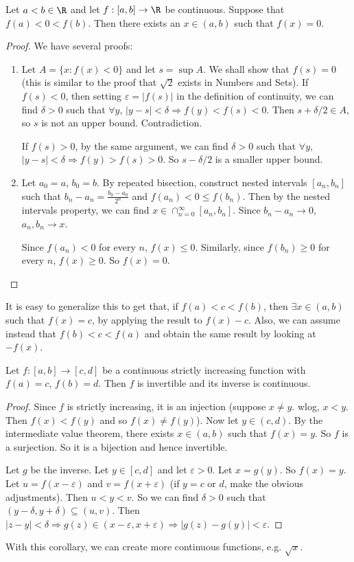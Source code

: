 \documentclass[a4paper]{article}
\begin{document}
\begin{thm}
  Let $a < b\in \R$ and let $f: [a, b] \to \R$ be continuous. Suppose that $f(a) < 0 < f(b)$. Then there exists an $x\in (a, b)$ such that $f(x) = 0$.
\end{thm}

\begin{proof}
  We have several proofs:
  \begin{enumerate}
    \item Let $A = \{x: f(x) < 0\}$ and let $s = \sup A$. We shall show that $f(s) = 0$ (this is similar to the proof that $\sqrt{2}$ exists in Numbers and Sets). If $f(s) < 0$, then setting $\varepsilon = |f(s)|$ in the definition of continuity, we can find $\delta > 0$ such that $\forall y$, $|y - s| < \delta \Rightarrow f(y) < f(s) < 0$. Then $s + \delta/2 \in A$, so $s$ is not an upper bound. Contradiction.

    If $f(s) > 0$, by the same argument, we can find $\delta > 0$ such that $\forall y$, $|y - s| < \delta \Rightarrow  f(y) > f(s) > 0$. So $s - \delta/2$ is a smaller upper bound.
  \item Let $a_0 = a$, $b_0 = b$. By repeated bisection, construct nested intervals $[a_n, b_n]$ such that $b_n - a_n = \frac{b_0 - a_0}{2^n}$ and $f(a_n) < 0 \leq f(b_n)$. Then by the nested intervals property, we can find $x\in \cap_{n = 0}^\infty [a_n, b_n]$. Since $b_n - a_n \to 0$, $a_n, b_n \to x$.

    Since $f(a_n) < 0$ for every $n$, $f(x) \leq 0$. Similarly, since $f(b_n) \geq 0$ for every $n$, $f(x) \geq 0$. So $f(x) = 0$.
  \end{enumerate}
\end{proof}
\note It is easy to generalize this to get that, if $f(a) < c < f(b)$, then $\exists x\in (a, b)$ such that $f(x) = c$, by applying the result to $f(x) - c$. Also, we can assume instead that $f(b) < c < f(a)$ and obtain the same result by looking at $-f(x)$.

\begin{cor}
  Let $f: [a, b]\to [c, d]$ be a continuous strictly increasing function with $f(a) = c$, $f(b) = d$. Then $f$ is invertible and its inverse is continuous.
\end{cor}

\begin{proof}
  Since $f$ is strictly increasing, it is an injection (suppose $x \not= y$. wlog, $x < y$. Then $f(x) < f(y)$ and so $f(x) \not= f(y)$). Now let $y\in (c, d)$. By the intermediate value theorem, there exists $x\in (a, b)$ such that $f(x) = y$. So $f$ is a surjection. So it is a bijection and hence invertible.

  Let $g$ be the inverse. Let $y\in [c, d]$ and let $\varepsilon > 0$. Let $x = g(y)$. So $f(x) = y$. Let $u = f(x - \varepsilon)$ and $v = f(x + \varepsilon)$ (if $y = c$ or $d$, make the obvious adjustments). Then $u < y < v$. So we can find $\delta > 0$ such that $(y - \delta , y + \delta) \subseteq (u, v)$. Then $|z - y| < \delta \Rightarrow  g(z) \in (x - \varepsilon, x + \varepsilon) \Rightarrow  |g(z) - g(y)| < \varepsilon$.
\end{proof}
With this corollary, we can create more continuous functions, e.g. $\sqrt{x}$.
\end{document}
